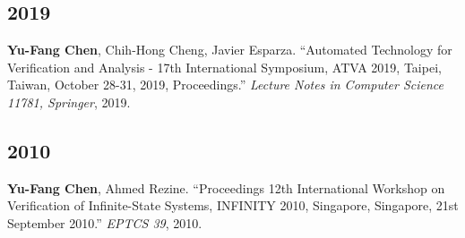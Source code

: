 \documentclass[10.5pt]{article}
\begin{document}
\subsection*{2019}
\begin{enumerate}[leftmargin=*,label={[\arabic*]},resume]
\item \textbf{Yu-Fang Chen}, Chih-Hong Cheng, Javier Esparza. ``Automated Technology for Verification and Analysis - 17th International Symposium, ATVA 2019, Taipei, Taiwan, October 28-31, 2019, Proceedings.'' \emph{Lecture Notes in Computer Science 11781, Springer}, 2019.
\end{enumerate}
\subsection*{2010}
\begin{enumerate}[leftmargin=*,label={[\arabic*]},resume]
\item \textbf{Yu-Fang Chen}, Ahmed Rezine. ``Proceedings 12th International Workshop on Verification of Infinite-State Systems, INFINITY 2010, Singapore, Singapore, 21st September 2010.'' \emph{EPTCS 39}, 2010.
\end{enumerate}
\end{document}
